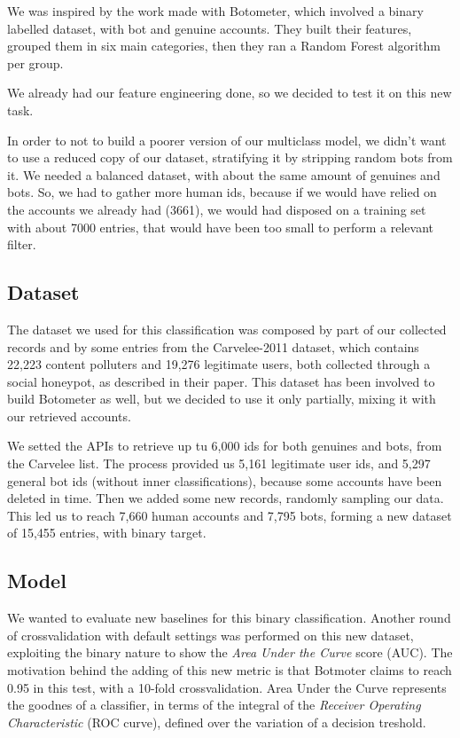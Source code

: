 We was inspired by the work made with Botometer\cite{Botometer}, which involved a binary labelled dataset, with bot and genuine accounts.
They built their features, grouped them in six main categories, then they ran a Random Forest algorithm per group.

We already had our feature engineering done, so we decided to test it on this new task.

In order to not to build a poorer version of our multiclass model, we didn't want to use a reduced copy of our dataset, stratifying it by stripping random bots from it. We needed a balanced dataset, with about the same amount of genuines and bots. So, we had to gather more human ids, because if we would have relied on the accounts we already had (3661), we would had disposed on a training set with about 7000 entries, that would have been too small to perform a relevant filter.
\subsection{Dataset}
The dataset we used for this classification was composed by part of our collected records and by some entries from the Carvelee-2011 dataset, which contains 22,223 content polluters and 19,276 legitimate users, both collected through a social honeypot, as described in their paper\cite{Lee11sevenmonths}.
This dataset has been involved to build Botometer as well, but we decided to use it only partially, mixing it with our retrieved accounts.

We setted the APIs to retrieve up tu 6,000 ids for both genuines and bots, from the Carvelee list. The process provided us 5,161 legitimate user ids, and 5,297 general bot ids (without inner classifications), because some accounts have been deleted in time.
Then we added some new records, randomly sampling our data. This led us to reach 7,660 human accounts and 7,795 bots, forming a new dataset of 15,455 entries, with binary target.
\subsection{Model}
We wanted to evaluate new baselines for this binary classification.
Another round of crossvalidation with default settings was performed on this new dataset, exploiting the binary nature to show the \textit{Area Under the Curve} score (AUC). The motivation behind the adding of this new metric is that Botmoter claims to reach 0.95 in this test, with a 10-fold crossvalidation. 
Area Under the Curve represents the goodnes of a classifier, in terms of the integral of the \textit{Receiver Operating Characteristic} (ROC curve), defined over the variation of a decision treshold.


